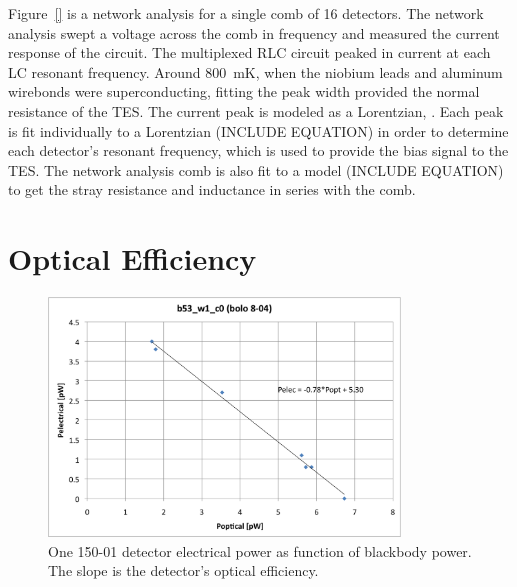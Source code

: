 Figure~\ref{} is a network analysis for a single comb of 16 detectors. 
The network analysis swept a voltage across the comb in frequency and measured the current response of the circuit. 
The multiplexed RLC circuit peaked in current at each LC resonant frequency. 
Around 800~mK, when the niobium leads and aluminum wirebonds were superconducting, fitting the peak width provided the normal resistance of the \ac{TES}. 
The current peak is modeled as a Lorentzian, . 
Each peak is fit individually to a Lorentzian (INCLUDE EQUATION) in order to determine each detector's resonant frequency, which is used to provide the bias signal to the TES. 
The network analysis comb is also fit to a model (INCLUDE EQUATION) to get the stray resistance and inductance in series with the comb. 


\section{Optical Efficiency}
\label{sec:optical_efficiency}

\begin{figure}[ht!]
\begin{center}
\includegraphics[height=2.5in]{figures/Nb01_PelecvsPopt_b53_w1_c0}
\caption{One 150-01 detector electrical power as function of blackbody power. The slope is the detector's optical efficiency. 
\label{fig:pelec_vs_popt} }
\end{center}
\end{figure}



